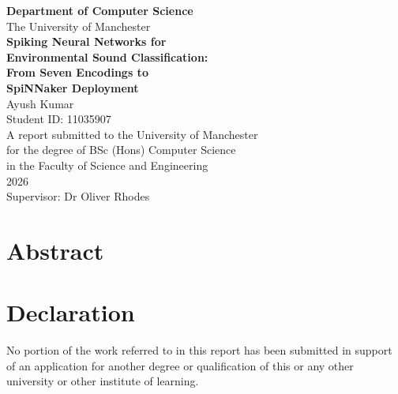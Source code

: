 \documentclass[12pt,a4paper,oneside]{report}
\begin{document}
\begin{titlepage}
\centering
\vspace*{2cm}
{\Large\bfseries Department of Computer Science}\\[0.3cm]
{\large The University of Manchester}\\[2cm]
{\Huge\bfseries Spiking Neural Networks for\\Environmental Sound Classification:\\[0.3cm]
From Seven Encodings to\\SpiNNaker Deployment}\\[2.5cm]
{\Large Ayush Kumar}\\[0.5cm]
{\large Student ID: 11035907}\\[2cm]
{\large A report submitted to the University of Manchester\\
for the degree of BSc (Hons) Computer Science\\
in the Faculty of Science and Engineering}\\[1.5cm]
{\large 2026}\\[1cm]
{\large Supervisor: Dr Oliver Rhodes}
\end{titlepage}


\chapter*{Abstract}


\chapter*{Declaration}
No portion of the work referred to in this report has been submitted in support of an application for another degree or qualification of this or any other university or other institute of learning.

\end{document}
